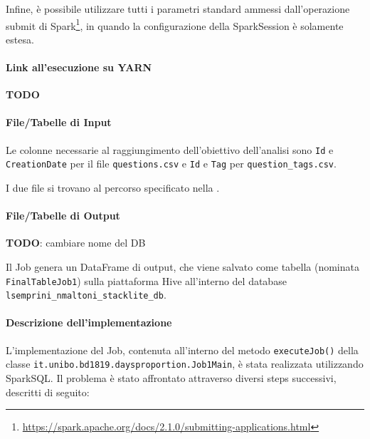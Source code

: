   Infine, è possibile utilizzare tutti i parametri standard ammessi dall'operazione submit di Spark\footnote{\url{https://spark.apache.org/docs/2.1.0/submitting-applications.html}},
  in quando la configurazione della SparkSession è solamente estesa.

  \paragraph{Link all'esecuzione su YARN}\label{par:job1:spark:yarn}

  \textbf{TODO}

  \paragraph{File/Tabelle di Input}\label{par:job1:spark:input}

  Le colonne necessarie al raggiungimento dell'obiettivo dell'analisi sono \texttt{Id} e \texttt{CreationDate} per il file \texttt{questions.csv}
  e \texttt{Id} e \texttt{Tag} per \texttt{question\_tags.csv}.

  I due file si trovano al percorso specificato nella .

  \paragraph{File/Tabelle di Output}\label{par:job1:spark:output}

  \textbf{TODO}: cambiare nome del DB

  Il Job genera un DataFrame di output, che viene salvato come tabella (nominata \texttt{FinalTableJob1})
  sulla piattaforma Hive all'interno del database \texttt{lsemprini\_nmaltoni\_stacklite\_db}.

  \paragraph{Descrizione dell'implementazione}\label{par:job1:spark:implementation}

  L'implementazione del Job, contenuta all'interno del metodo \texttt{executeJob()} della classe \texttt{it.unibo.bd1819.daysproportion.Job1Main},
  è stata realizzata utilizzando SparkSQL\@.
  Il problema è stato affrontato attraverso diversi steps successivi, descritti di seguito:

